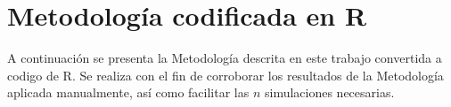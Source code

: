 \documentclass[11pt,twoside,openright,spanish]{report}
\numberwithin{equation}{chapter}
\numberwithin{figure}{chapter}
\numberwithin{table}{chapter}
\begin{document}

	 
	 

 
	

	
	

 


 

\clearpage
\appendix 

\fancyhead[LO]{}
\fancyhead[RE]{}
\pagestyle{fancy}

\chapter{Metodología codificada en R }\label{desarrolloconstadm}

A continuación se presenta la Metodología descrita en este trabajo convertida a codigo de R. Se realiza con el fin de corroborar los resultados de la Metodología aplicada manualmente, así como facilitar las $n$ simulaciones necesarias.
\end{document}
